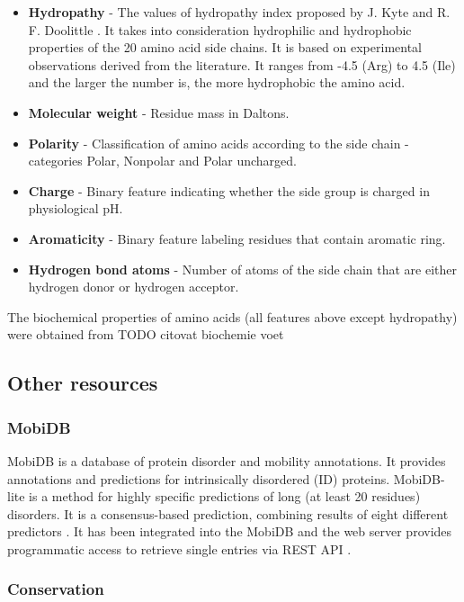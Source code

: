 \begin{itemize}
\item \textbf{Hydropathy} - The values of hydropathy index proposed by J. Kyte and R. F. Doolittle \cite{kyte}. It takes into consideration hydrophilic and hydrophobic properties of the 20 amino acid side chains. It is based on experimental observations derived from the literature. It ranges from -4.5 (Arg) to 4.5 (Ile) and the larger the number is, the more hydrophobic the amino acid.
\item \textbf{Molecular weight} - Residue mass in Daltons.
\item \textbf{Polarity} - Classification of amino acids according to the side chain - categories Polar, Nonpolar and Polar uncharged.
\item \textbf{Charge} - Binary feature indicating whether the side group is charged in physiological pH.
\item \textbf{Aromaticity} - Binary feature labeling residues that contain aromatic ring.
\item \textbf{Hydrogen bond atoms} - Number of atoms of the side chain that are either hydrogen donor or hydrogen acceptor.
\end{itemize}

The biochemical properties of amino acids (all features above except hydropathy) were obtained from TODO citovat biochemie voet

\subsection{Other resources}

\subsubsection{MobiDB}

MobiDB is a database of protein disorder and mobility annotations. It provides annotations and predictions for intrinsically disordered (ID) proteins. MobiDB-lite is a method for highly specific predictions of long (at least 20 residues) disorders. It is a consensus-based prediction, combining results of eight different predictors
\cite{mobidb}. It has been integrated into the MobiDB and the web server provides programmatic access to retrieve single entries via REST API \cite{mobidbApi}.

\subsubsection{Conservation}

